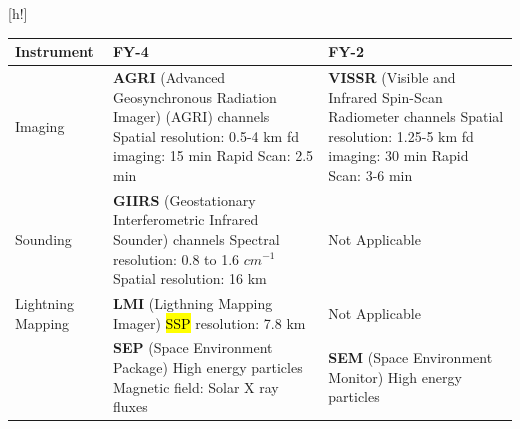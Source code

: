 \documentclass{article}
\makeatletter
\renewenvironment{table}
     {\@float{table} \small}
     {\end@float}
\makeatother
\begin{document}
\begin{table}[h!]
\centering
\caption{The FY family. Source: \url{https://directory.eoportal.org/web/eoportal/satellite-missions/f/fy-4}}
\label{tb:fy4_vs_fy2}
\begin{tabularx}{\textwidth}{L{0.4}L{1.3}L{1.3}}
\toprule
Instrument & FY-4 & FY-2 \\ 
\midrule
Imaging &   \textbf{AGRI} (Advanced Geosynchronous Radiation Imager) (AGRI)  channels \newline
            Spatial resolution: 0.5-4 km \newline
            \ac{fd} imaging: 15 min \newline 
            Rapid Scan: 2.5 min 
        &   \textbf{VISSR} (Visible and Infrared Spin-Scan Radiometer channels \newline
            Spatial resolution: 1.25-5 km \newline
            \ac{fd} imaging: 30 min \newline
            Rapid Scan: 3-6 min \\
\midrule
Sounding & \textbf{GIIRS} (Geostationary Interferometric Infrared Sounder)  channels \newline
            Spectral resolution: 0.8 to 1.6 $cm^{-1}$ \newline
            Spatial resolution: 16 km 
        &  Not Applicable \\
\midrule
Lightning \newline 
Mapping &   \textbf{LMI} (Ligthning Mapping Imager) \newline   
            \hl{SSP} resolution: 7.8 km
        &  Not Applicable \\
\midrule
&   \textbf{SEP} (Space Environment Package) \newline
    High energy particles \newline
    Magnetic field: Solar X ray fluxes 
&   \textbf{SEM} (Space Environment Monitor) \newline
    High energy particles \\
\bottomrule
\end{tabularx}
\end{table}
\end{document}
